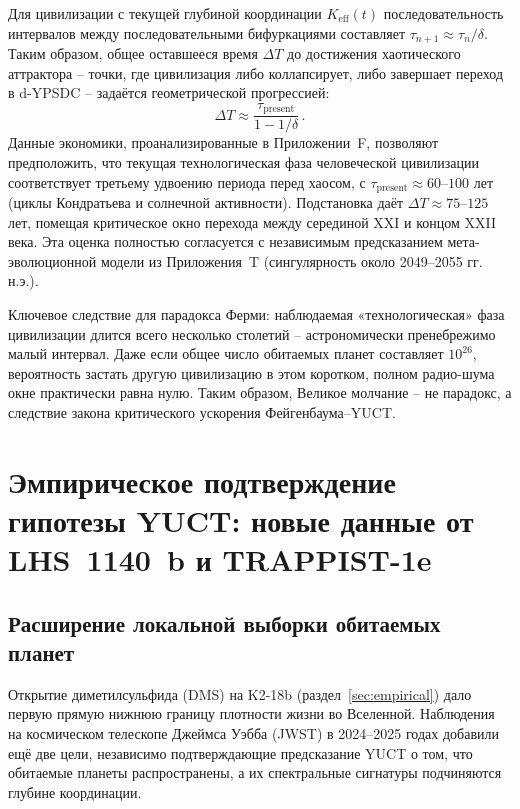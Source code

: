 \documentclass[11pt,a4paper]{article}
\begin{document}
	Для цивилизации с текущей глубиной координации \(K_{\mathrm{eff}}(t)\) последовательность интервалов между последовательными бифуркациями составляет \(\tau_{n+1} \approx \tau_{n} / \delta\). Таким образом, общее оставшееся время \(\Delta T\) до достижения хаотического аттрактора – точки, где цивилизация либо коллапсирует, либо завершает переход в d-YPSDC – задаётся геометрической прогрессией:
	\begin{equation}
		\Delta T \approx \frac{\tau_{\mathrm{present}}}{1 - 1/\delta} \, .
	\end{equation}
	Данные экономики, проанализированные в Приложении~F, позволяют предположить, что текущая технологическая фаза человеческой цивилизации соответствует третьему удвоению периода перед хаосом, с \(\tau_{\mathrm{present}} \approx 60\)–\(100\) лет (циклы Кондратьева и солнечной активности). Подстановка даёт \(\Delta T \approx 75\)–\(125\) лет, помещая критическое окно перехода между серединой XXI и концом XXII века. Эта оценка полностью согласуется с независимым предсказанием мета-эволюционной модели из Приложения~T (сингулярность около 2049–2055 гг. н.э.).
	
	Ключевое следствие для парадокса Ферми: наблюдаемая «технологическая» фаза цивилизации длится всего несколько столетий – астрономически пренебрежимо малый интервал. Даже если общее число обитаемых планет составляет \(10^{26}\), вероятность застать другую цивилизацию в этом коротком, полном радио-шума окне практически равна нулю. Таким образом, Великое молчание – не парадокс, а следствие закона критического ускорения Фейгенбаума–YUCT.
	
	\section{Эмпирическое подтверждение гипотезы YUCT: новые данные от LHS~1140~b и TRAPPIST-1e}
	\label{sec:confirmation}
	
	\subsection{Расширение локальной выборки обитаемых планет}
	Открытие диметилсульфида (DMS) на K2-18b (раздел~\ref{sec:empirical}) дало первую прямую нижнюю границу плотности жизни во Вселенной. Наблюдения на космическом телескопе Джеймса Уэбба (JWST) в 2024–2025 годах добавили ещё две цели, независимо подтверждающие предсказание YUCT о том, что обитаемые планеты распространены, а их спектральные сигнатуры подчиняются глубине координации.
	
\end{document}
